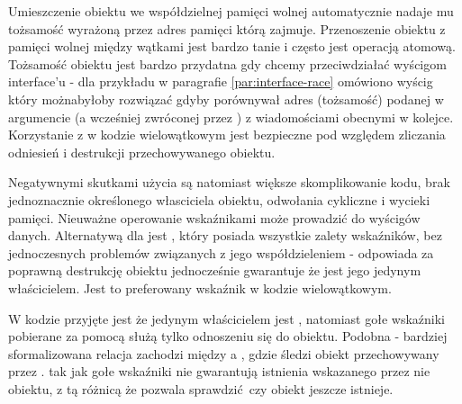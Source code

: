 Umieszczenie obiektu we współdzielnej pamięci wolnej automatycznie nadaje mu tożsamość wyrażoną przez adres pamięci którą zajmuje. Przenoszenie obiektu z pamięci wolnej między wątkami jest bardzo tanie i często jest operacją atomową. Tożsamość obiektu jest bardzo przydatna gdy chcemy przeciwdziałać wyścigom interface'u - dla przykładu w paragrafie \ref{par:interface-race} omówiono wyścig który możnabyłoby rozwiązać gdyby  porównywał adres (tożsamość) podanej w argumencie (a wcześniej zwróconej przez ) z wiadomościami obecnymi w kolejce. Korzystanie z  w kodzie wielowątkowym jest bezpieczne pod względem zliczania odniesień i destrukcji przechowywanego obiektu.

Negatywnymi skutkami użycia  są natomiast większe skomplikowanie kodu, brak jednoznacznie określonego własciciela obiektu, odwołania cykliczne i wycieki pamięci. Nieuważne operowanie wskaźnikami może prowadzić do wyścigów danych.
Alternatywą dla  jest , który posiada wszystkie zalety wskaźników, bez jednoczesnych problemów związanych z jego współdzieleniem - odpowiada za poprawną destrukcję obiektu jednocześnie gwarantuje że jest jego jedynym właścicielem. Jest to preferowany wskaźnik w kodzie wielowątkowym.

W kodzie przyjęte jest że jedynym właścicielem jest , natomiast gołe wskaźniki pobierane za pomocą  służą tylko odnoszeniu się do obiektu.
Podobna - bardziej sformalizowana relacja zachodzi między  a , gdzie  śledzi obiekt przechowywany przez .
 tak jak gołe wskaźniki nie gwarantują istnienia wskazanego przez nie obiektu, z tą różnicą że  pozwala sprawdzić czy obiekt jeszcze istnieje.
